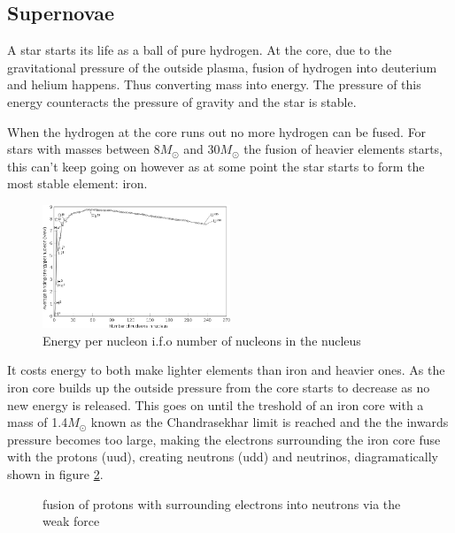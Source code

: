 \documentclass[11pt,a4paper,faculty=we,language=en,doctype=report]{cls/ugent-doc}
\begin{document}
\subsection{Supernovae}
\label{sec:supernovae}
A star starts its life as a ball of pure hydrogen. At the core, due to the
gravitational pressure of the outside plasma, fusion of hydrogen into deuterium
and helium happens. Thus converting mass into energy. The pressure of this energy
counteracts the pressure of gravity and the star is stable.

When the hydrogen at the core runs out no more hydrogen can be fused. For
stars with masses between $8M_\odot$ and $30M_\odot$ the
fusion of heavier elements starts, this can't keep going on however as at some
point the star starts to form the most stable element: iron. 
\begin{figure}[!ht]
	\centering
	\includegraphics[width=0.5\textwidth]{Binding_energy_curve.png}
	\caption{Energy per nucleon i.f.o number of nucleons in the nucleus}
	\label{fig:BindingEnergyCurve}
\end{figure}
It costs energy
to both make lighter elements than iron and heavier ones.  As the iron core
builds up the outside pressure from the core starts to decrease as no new
energy is released. This goes on until  the treshold of an iron core with a mass of 1.4$M_\odot$ known as the 
Chandrasekhar limit is reached and the the inwards pressure becomes too large,
making the electrons surrounding the iron core fuse with the protons (uud),
creating neutrons (udd) and neutrinos, diagramatically shown in figure
\ref{fig:CoreFusion}.
\begin{figure}
	\centering
	\caption{fusion of protons with surrounding electrons into neutrons via the weak force}
	\label{fig:CoreFusion}
\end{figure}\\
\end{document}
